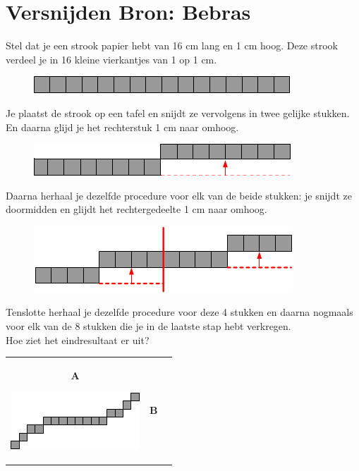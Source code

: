 \documentclass[12pt, a4paper]{article}
\begin{document}
	\begin{minipage}{\textwidth}
		\section{Versnijden \hfill\small Bron: Bebras}
			Stel dat je een strook papier hebt van 16 cm lang en 1 cm hoog. Deze strook verdeel je in 16 kleine vierkantjes van 1 op 1 cm.
			\begin{figure}[H]
				\centering
				\includegraphics[width=0.6\linewidth]{image1}
			\end{figure}
			Je plaatst de strook op een tafel en snijdt ze vervolgens in twee gelijke stukken. En daarna glijd je het rechterstuk 1 cm naar omhoog.
			\begin{figure}[H]
				\centering
				\includegraphics[width=0.6\linewidth]{image2}
			\end{figure}
			Daarna herhaal je dezelfde procedure voor elk van de beide stukken: je snijdt ze doormidden en glijdt het rechtergedeelte 1 cm naar omhoog.
			\begin{figure}[H]
				\centering
				\includegraphics[width=0.6\linewidth]{image3}
			\end{figure}
			Tenslotte herhaal je dezelfde procedure voor deze 4 stukken en daarna nogmaals voor elk van de 8 stukken die je in de laatste stap hebt verkregen. \\
			
			Hoe ziet het eindresultaat er uit?
			
			\begin{table}[H]
				\centering
				\begin{tabulary}{\linewidth}{|C|C|C|}
					\hline
					\textbf{A} \vspace{0.2cm}
					
					\includegraphics[width=0.9\linewidth]{option1}
					&
					\textbf{B} \vspace{0.2cm}
					

\end{tabulary}
\end{table}
\end{minipage}
\end{document}
